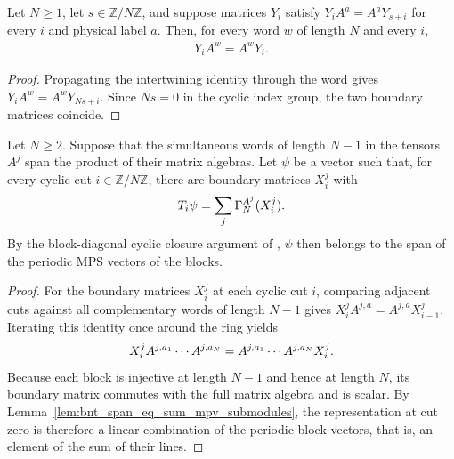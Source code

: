\begin{lemma}
    \label{thm:cyclic-boundary-intertwining}
    \leanok
    Let $N\geq1$, let $s\in\mathbb Z/N\mathbb Z$, and suppose matrices $Y_i$
    satisfy $Y_iA^a=A^aY_{s+i}$ for every $i$ and physical label $a$.
    Then, for every word $w$ of length $N$ and every $i$,
    \begin{align}
        Y_iA^w=A^wY_i.
    \end{align}
\end{lemma}
\begin{proof}\leanok
    Propagating the intertwining identity through the word gives
    $Y_iA^w=A^wY_{Ns+i}$. Since $Ns=0$ in the cyclic index group, the two
    boundary matrices coincide.
\end{proof}

\begin{lemma}
    \label{thm:ph_block_cyclic_boundary_closure}
    \leanok
    Let $N\geq2$. Suppose that the simultaneous words of length $N-1$
    in the tensors $A^j$ span the product of their matrix algebras.
    Let $\psi$ be a vector such that, for every cyclic cut
    $i\in\mathbb Z/N\mathbb Z$, there are boundary matrices $X_i^j$ with
    \begin{align}
        T_i\psi=\sum_j\Gamma_N^{A^j}(X_i^j).
        \notag
    \end{align}
    By the block-diagonal cyclic closure argument of
    \cite[Section~IV.C]{Cirac2021Matrix}, $\psi$ then belongs to the span of
    the periodic MPS vectors of the blocks.
\end{lemma}
\begin{proof}
    \leanok
    For the boundary matrices $X_i^j$ at each cyclic cut $i$, comparing
    adjacent cuts against all complementary words of length $N-1$
    gives $X_i^j A^{j,a}=A^{j,a}X_{i-1}^j$.
    Iterating this identity once around the ring yields
    \begin{align}
        X_i^j A^{j,a_1}\cdots A^{j,a_N}
        =A^{j,a_1}\cdots A^{j,a_N}X_i^j.
        \notag
    \end{align}
    Because each block is injective at length $N-1$ and hence at length $N$,
    its boundary matrix commutes with the full matrix algebra
    and is scalar. By Lemma~\ref{lem:bnt_span_eq_sum_mpv_submodules}, the
    representation at cut zero is therefore a
    linear combination of the periodic block vectors, that is, an element of
    the sum of their lines.
\end{proof}

